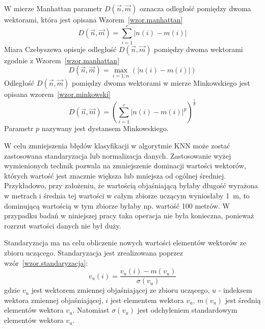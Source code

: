 \documentclass[a4paper,twoside,12pt]{book}
\begin{document}
    W mierze Manhattan parametr $D(\overrightarrow{n},\overrightarrow{m})$ oznacza odległość pomiędzy dwoma wektorami,
    która jest opisana Wzorem~\ref{wzor.manhattan}
    \large
    \begin{equation}
        D(\overrightarrow{n},\overrightarrow{m})=\sum_{i=1}^{c}\left |n(i)-m(i)\right |
        \label{wzor.manhattan}
    \end{equation}
    \normalsize
    Miara Czebyszewa opisuje odległość $D(\overrightarrow{n},\overrightarrow{m})$ pomiędzy dwoma wektorami zgodnie z Wzorem~\ref{wzor.manhattan}
    \large
    \begin{equation}
        D(\overrightarrow{n},\overrightarrow{m})=\max_{i=1:n}( \left |n(i)-m(i) \right |)
        \label{wzor.czebyszew}
    \end{equation}
    \normalsize
    Odległość $D(\overrightarrow{n},\overrightarrow{m})$ pomiędzy dwoma wektorami w mierze Minkowskiego jest opisana
    wzorem~\ref{wzor.minkowski}
    \large
    \begin{equation}
        D(\overrightarrow{n},\overrightarrow{m})=(\sum_{i=1}^{c} \left |n(i)-m(i) \right |^{p})^{\frac{1}{p}}
        \label{wzor.minkowski}
    \end{equation}
    \normalsize
    Parametr $p$ nazywany jest dystansem Minkowskiego.

    W celu zmniejszenia błędów klasyfikacji w algorytmie KNN może zostać zastosowana standaryzacja lub normalizacja danych.
    Zastosowanie wyżej wymienionych technik pozwala na zmniejszenie dominacji wartości wektorów, których wartość jest
    znacznie większa lub mniejsza od ogólnej średniej. Przykładowo, przy założeniu, że
    wartością objaśniającą byłaby długość wyrażona w metrach i średnia tej wartości w całym zbiorze uczącym
    wyniosłaby 1~m,
    to dominującą wartością w tym zbiorze byłaby np. wartość 100 metrów.
    W przypadku badań w niniejszej pracy taka operacja nie była konieczna, ponieważ rozrzut wartości danych nie był
    duży.

    Standaryzacja ma na celu obliczenie nowych wartości elementów wektorów ze zbioru uczącego.
    Standaryzacja jest zrealizowana poprzez wzór~\ref{wzor.standaryzacja}:
    \large
    \begin{equation}
    {v}
        _{u}(i) = \frac{{v}_{u}(i)-m({v}_{u})}{\sigma({v}_{u})}
        \label{wzor.standaryzacja}
    \end{equation}
    \normalsize
    gdzie ${v}_{u}$ jest wektorem zmiennej objaśniającej ze zbioru uczącego, $u$ - indeksem wektora zmiennej
    objaśniającej, $i$ jest elementem wektora ${v}_{u}$, $m({v}_{u})$ jest średnią elementów wektora
    ${v}_{u}$. Natomiast $\sigma({v}_{u})$ jest odchyleniem standardowym elementów wektora ${v}_{u}$.
\end{document}
